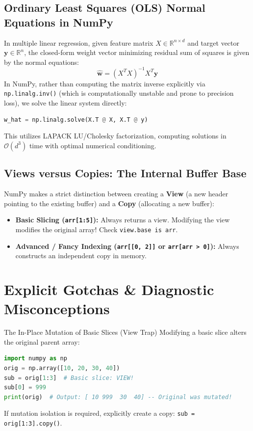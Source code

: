 \subsection{Ordinary Least Squares (OLS) Normal Equations in NumPy}
In multiple linear regression, given feature matrix $X \in \mathbb{R}^{n \times d}$ and target vector $\mathbf{y} \in \mathbb{R}^n$, the closed-form weight vector minimizing residual sum of squares is given by the normal equations:
\begin{equation}
\hat{\mathbf{w}} = (X^T X)^{-1} X^T \mathbf{y}
\end{equation}
In NumPy, rather than computing the matrix inverse explicitly via \texttt{np.linalg.inv()} (which is computationally unstable and prone to precision loss), we solve the linear system directly:
\begin{lstlisting}[language=Python]
w_hat = np.linalg.solve(X.T @ X, X.T @ y)
\end{lstlisting}
This utilizes LAPACK LU/Cholesky factorization, computing solutions in $\mathcal{O}(d^3)$ time with optimal numerical conditioning.

\subsection{Views versus Copies: The Internal Buffer Base}
NumPy makes a strict distinction between creating a \textbf{View} (a new header pointing to the existing buffer) and a \textbf{Copy} (allocating a new buffer):
\begin{itemize}
    \item \textbf{Basic Slicing (\texttt{arr[1:5]}):} Always returns a view. Modifying the view modifies the original array! Check \texttt{view.base is arr}.
    \item \textbf{Advanced / Fancy Indexing (\texttt{arr[[0, 2]]} or \texttt{arr[arr > 0]}):} Always constructs an independent copy in memory.
\end{itemize}

\section{Explicit Gotchas \& Diagnostic Misconceptions}

\begin{trapbox}{The In-Place Mutation of Basic Slices (View Trap)}
Modifying a basic slice alters the original parent array:
\begin{lstlisting}[language=Python]
import numpy as np
orig = np.array([10, 20, 30, 40])
sub = orig[1:3]  # Basic slice: VIEW!
sub[0] = 999
print(orig)  # Output: [ 10 999  30  40] -- Original was mutated!
\end{lstlisting}
If mutation isolation is required, explicitly create a copy: \texttt{sub = orig[1:3].copy()}.
\end{trapbox}

